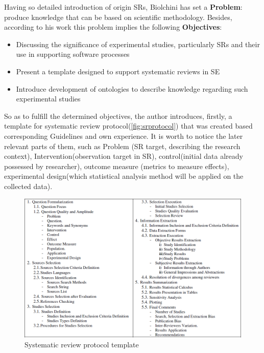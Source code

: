 	Having so detailed introduction of origin SRs, Biolchini has set a \textbf{Problem}: produce knowledge that can be based on scientific methodology. Besides, according to his work this problem implies the following \textbf{Objectives}:
		\begin{itemize}
			\item Discussing the significance of experimental studies, particularly SRs and their use in supporting software processes
			\item Present a template designed to support systematic reviews in SE
			\item Introduce development of ontologies to describe knowledge regarding such experimental studies
		\end{itemize}    
	So as to fulfill the determined objectives, the author introduces, firstly, a template for systematic review protocol(\autoref{fig:srprotocol}) that was created based corresponding Guidelines\cite{Kit07} and own experience. It is worth to notice the later relevant parts of them, such as Problem (SR target, describing the research context), Intervention(observation target in SR), control(initial data already possessed by researcher), outcome measure (metrics to measure effects), experimental design(which statistical analysis method will be applied on the collected data).
	\begin{figure}
		\centering
		\includegraphics[width=15cm]{images/SRreviewprotocol.PNG}
		\caption{Systematic review protocol template\cite[p. 142]{Bio07}}
		\label{fig:srprotocol}
	\end{figure}
	 \newline
	
